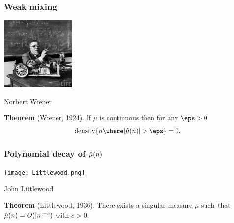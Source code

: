 
\begin{frame}
  \frametitle{Weak mixing}

  \begin{center}
  \includegraphics[height=36mm]{NorbertWiener.jpg}
  
  Norbert Wiener
  \end{center}
  
  \bigskip
  {\bf Theorem} (Wiener, 1924). %
  If $\mu$ is continuous then for any $\eps > 0$ 
  $$
    \mathrm{density}\{n \where |\Hat\mu(n)| > \eps\} = 0. 
  $$
  
    
\end{frame}


\begin{frame}
  \frametitle{Polynomial decay of $\Hat\mu(n)$}

  \begin{center}
  \texttt{[image: Littlewood.png]}
  
  John Littlewood
  \end{center}

  \bigskip
  {\bf Theorem} (Littlewood, 1936). %
  There exists a singular measure $\mu$ such~that $\Hat\mu(n) = O(|n|^{-c})$ with $c > 0$.
  
  \bigskip
    
\end{frame}


